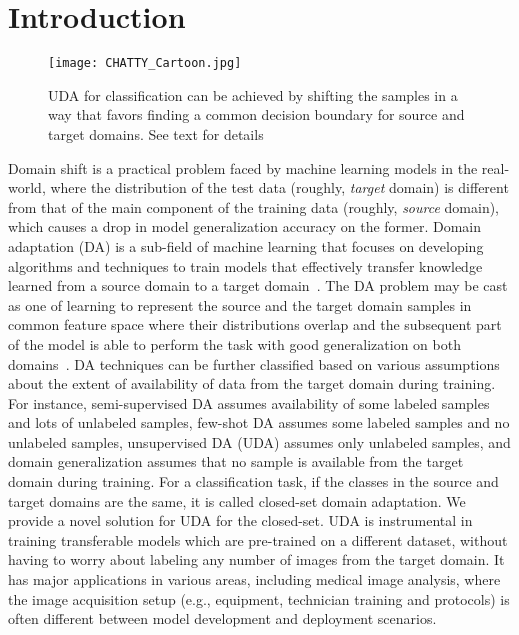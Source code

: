 \documentclass[10pt,twocolumn,letterpaper]{article}
\begin{document}
\section{Introduction}


\begin{figure}[h]
\begin{center}
   \texttt{[image: CHATTY\_Cartoon.jpg]}
\end{center}
   \caption{UDA for classification can be achieved by shifting the samples in a way that favors finding a common decision boundary for source and target domains. See text for details}
\label{fig:concept1}
\end{figure}

Domain shift is a practical problem faced by machine learning models in the real-world, where the distribution of the test data (roughly, \emph{target} domain) is different from that of the main component of the training data (roughly, \emph{source} domain), which causes a drop in model generalization accuracy on the former. Domain adaptation (DA) is a sub-field of machine learning that focuses on developing algorithms and techniques to train models that effectively transfer knowledge learned from a source domain to a target domain~\cite{da}. The DA problem may be cast as one of learning to represent the source and the target domain samples in common feature space where their distributions overlap and the subsequent part of the model is able to perform the task with good generalization on both domains~\cite{ondeep}. DA techniques can be further classified based on various assumptions about the extent of availability of data from the target domain during training. For instance, semi-supervised DA assumes availability of some labeled samples and lots of unlabeled samples, few-shot DA assumes some labeled samples and no unlabeled samples, unsupervised DA (UDA) assumes only unlabeled samples, and domain generalization assumes that no sample is available from the target domain during training.  For a classification task, if the classes in the source and target domains are the same, it is called closed-set domain adaptation.  We provide a novel solution for UDA for the closed-set. UDA is instrumental in training transferable models which are pre-trained on a different dataset, without having to worry about labeling any number of images from the target domain. It has major applications in various areas, including medical image analysis, where the image acquisition setup (e.g., equipment, technician training and protocols) is often different between model development and deployment scenarios.
\end{document}
